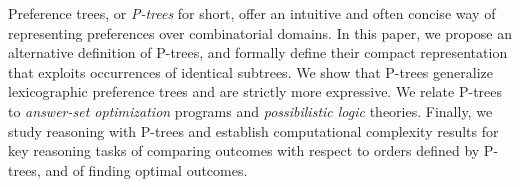 Preference trees, or \emph{P-trees} for short, offer an intuitive and
often concise way of representing preferences over combinatorial domains. 
In this paper, we propose an alternative definition of P-trees, and 
formally define their compact representation that exploits occurrences 
of identical subtrees. We show that P-trees generalize lexicographic 
preference trees and are strictly more expressive. We relate P-trees 
to \textit{answer-set optimization} programs and \textit{possibilistic 
logic} theories. Finally, we study reasoning with P-trees and 
establish computational complexity results for key reasoning tasks
of comparing outcomes with respect to orders defined by P-trees, and 
of finding optimal outcomes.

